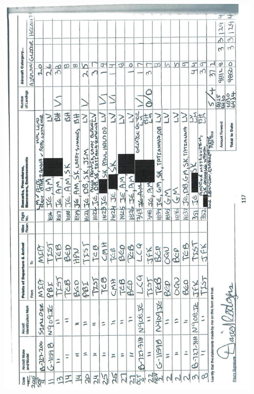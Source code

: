 \documentclass[10pt]{article}
\begin{document}
\includegraphics[max width=\textwidth, center]{2025_02_27_dd68c3d38de88f0516d9g-121}
\end{document}
